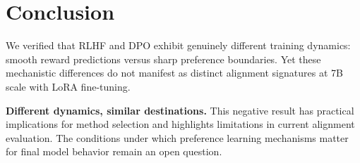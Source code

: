\section{Conclusion}

We verified that RLHF and DPO exhibit genuinely different training dynamics: smooth reward predictions versus sharp preference boundaries. Yet these mechanistic differences do not manifest as distinct alignment signatures at 7B scale with LoRA fine-tuning.

\textbf{Different dynamics, similar destinations.} This negative result has practical implications for method selection and highlights limitations in current alignment evaluation. The conditions under which preference learning mechanisms matter for final model behavior remain an open question.
